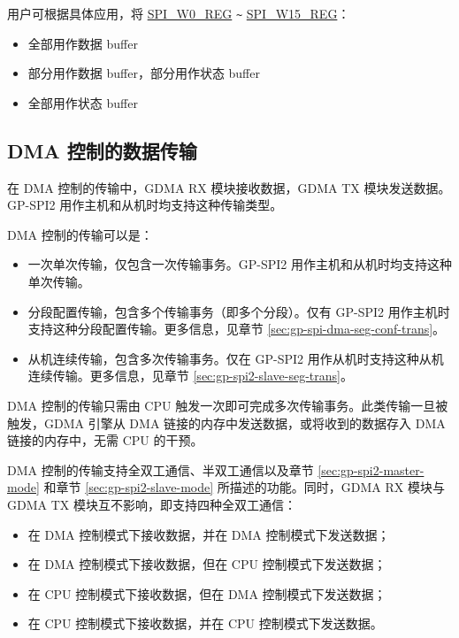 \documentclass[main\_\_CN.tex]{subfiles}
\begin{document}
用户可根据具体应用，将 \hyperref[regdesc:SPIW0REG]{SPI\_W0\_REG} \verb+~+ \hyperref[regdesc:SPIW0REG]{SPI\_W15\_REG}：
\begin{itemize}
    \item 全部用作数据 buffer
    \item 部分用作数据 buffer，部分用作状态 buffer
    \item 全部用作状态 buffer
\end{itemize}



\subsection{DMA 控制的数据传输}\label{sec:usage-of-gp-spi2-dma-controlled-mode}

在 DMA 控制的传输中，GDMA RX 模块接收数据，GDMA TX 模块发送数据。GP-SPI2 用作主机和从机时均支持这种传输类型。

DMA 控制的传输可以是：

\begin{itemize}
    \item 一次单次传输，仅包含一次传输事务。GP-SPI2 用作主机和从机时均支持这种单次传输。
    \item 分段配置传输，包含多个传输事务（即多个分段）。仅有 GP-SPI2 用作主机时支持这种分段配置传输。更多信息，见章节  \ref{sec:gp-spi-dma-seg-conf-trans}。
    \item 从机连续传输，包含多次传输事务。仅在 GP-SPI2 用作从机时支持这种从机连续传输。更多信息，见章节  \ref{sec:gp-spi2-slave-seg-trans}。
\end{itemize}

DMA 控制的传输只需由 CPU 触发一次即可完成多次传输事务。此类传输一旦被触发，GDMA 引擎从 DMA 链接的内存中发送数据，或将收到的数据存入 DMA 链接的内存中，无需 CPU 的干预。

DMA 控制的传输支持全双工通信、半双工通信以及章节 \ref{sec:gp-spi2-master-mode} 和章节 \ref{sec:gp-spi2-slave-mode} 所描述的功能。同时，GDMA RX 模块与 GDMA TX 模块互不影响，即支持四种全双工通信：

\begin{itemize}
    \item 在 DMA 控制模式下接收数据，并在 DMA 控制模式下发送数据；
    
    \item 在 DMA 控制模式下接收数据，但在 CPU 控制模式下发送数据； 
    
    \item 在 CPU 控制模式下接收数据，但在 DMA 控制模式下发送数据；
    
    \item 在 CPU 控制模式下接收数据，并在 CPU 控制模式下发送数据。
    
\end{itemize}
\end{document}
